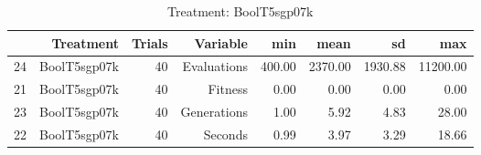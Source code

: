 \begin{table}[ht]
\centering
\begin{tabular}{rrrrrrrr}
  \hline
 & Treatment & Trials & Variable & min & mean & sd & max \\ 
  \hline
24 & BoolT5sgp07k &  40 & Evaluations & 400.00 & 2370.00 & 1930.88 & 11200.00 \\ 
  21 & BoolT5sgp07k &  40 & Fitness & 0.00 & 0.00 & 0.00 & 0.00 \\ 
  23 & BoolT5sgp07k &  40 & Generations & 1.00 & 5.92 & 4.83 & 28.00 \\ 
  22 & BoolT5sgp07k &  40 & Seconds & 0.99 & 3.97 & 3.29 & 18.66 \\ 
   \hline
\end{tabular}
\caption{Treatment: BoolT5sgp07k} 
\end{table}
